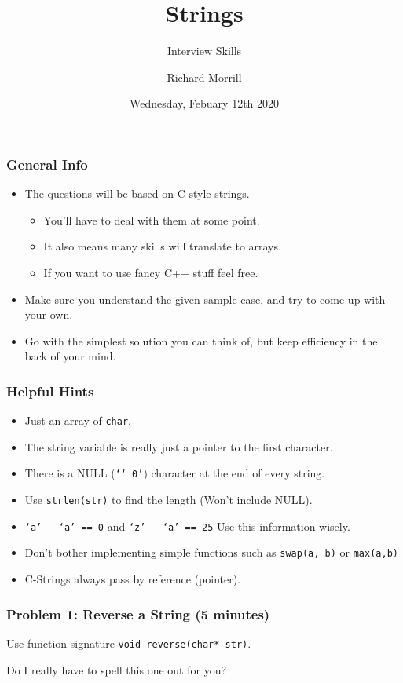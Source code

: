 \documentclass[aspectratio=169]{beamer}
\title{Strings}
\subtitle{Interview Skills}
\author{Richard Morrill}
\institute{Fordham University CS Society}
\date{Wednesday, Febuary 12th 2020}
\newcommand{\code}{\texttt}
\begin{document}
\begin{frame}
\titlepage
\end{frame}
\begin{frame}
    \frametitle{General Info}
    \begin{itemize}
        \item The questions will be based on C-style strings.
        \begin{itemize}
            \item You'll have to deal with them at some point.
            \item It also means many skills will translate to arrays.
            \item If you want to use fancy C++ stuff feel free.
        \end{itemize}
        \pause
        \item Make sure you understand the given sample case, and try to come up
        with your own.
        \pause
        \item Go with the simplest solution you can think of, but keep
        efficiency in the back of your mind.
    \end{itemize}
\end{frame}
\begin{frame}
    \frametitle{Helpful Hints}
    \begin{itemize}
        \item Just an array of \texttt{char}.
        \item The string variable is really just a pointer to the first character.
        \item There is a NULL (\texttt{`\char`\\0'}) character at the end of every string.
        \item Use \texttt{strlen(str)} to find the length (Won't include NULL).
        \item \texttt{`a' - `a' == 0} and \texttt{`z' - `a' == 25} Use this
        information wisely.
        \item Don't bother implementing simple functions such as \texttt{swap(a, b)} or \texttt{max(a,b)}
        \item C-Strings always pass by reference (pointer).
    \end{itemize}
\end{frame}
\begin{frame}
    \frametitle{Problem 1: Reverse a String (5 minutes)}
    Use function signature \code{void reverse(char* str)}.

    \vfill{}
    Do I really have to spell this one out for you?
\end{frame}
\end{document}
